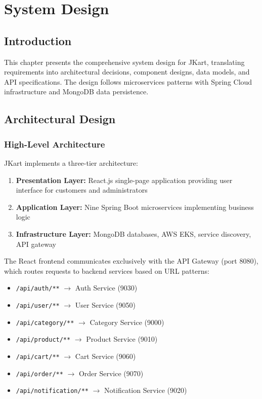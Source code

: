 \chapter{System Design}

\section{Introduction}

This chapter presents the comprehensive system design for JKart, translating requirements into architectural decisions, component designs, data models, and API specifications. The design follows microservices patterns with Spring Cloud infrastructure and MongoDB data persistence.

\section{Architectural Design}

\subsection{High-Level Architecture}

JKart implements a three-tier architecture:

\begin{enumerate}
    \item \textbf{Presentation Layer:} React.js single-page application providing user interface for customers and administrators
    \item \textbf{Application Layer:} Nine Spring Boot microservices implementing business logic
    \item \textbf{Infrastructure Layer:} MongoDB databases, AWS EKS, service discovery, API gateway
\end{enumerate}

The React frontend communicates exclusively with the API Gateway (port 8080), which routes requests to backend services based on URL patterns:
\begin{itemize}
    \item \texttt{/api/auth/**} $\rightarrow$ Auth Service (9030)
    \item \texttt{/api/user/**} $\rightarrow$ User Service (9050)
    \item \texttt{/api/category/**} $\rightarrow$ Category Service (9000)
    \item \texttt{/api/product/**} $\rightarrow$ Product Service (9010)
    \item \texttt{/api/cart/**} $\rightarrow$ Cart Service (9060)
    \item \texttt{/api/order/**} $\rightarrow$ Order Service (9070)
    \item \texttt{/api/notification/**} $\rightarrow$ Notification Service (9020)
\end{itemize}

